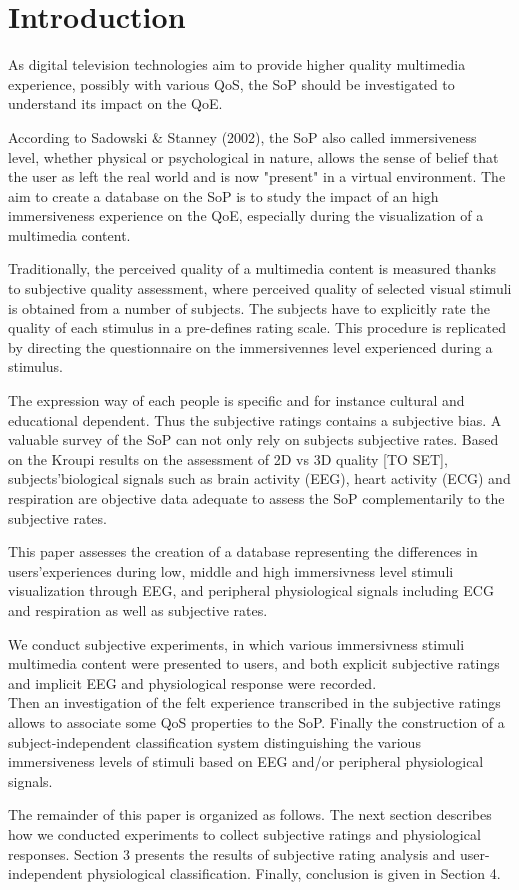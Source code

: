 \section{Introduction}
As digital television technologies aim to provide higher quality multimedia experience, possibly with various \ac{QoS}, the \ac{SoP} should be investigated to understand its impact on the \ac{QoE}.

According to Sadowski \& Stanney (2002), the \ac{SoP} also called immersiveness level, whether physical or psychological in nature, allows the sense of belief that the user as left the real world and is now "present" in a virtual environment. The aim to create a database on the \ac{SoP} is to study the impact of an high immersiveness experience on the \ac{QoE}, especially during the visualization of a multimedia content.

Traditionally, the perceived quality of a multimedia content is measured thanks to subjective quality assessment, where perceived quality of selected visual stimuli is obtained from a number of subjects. The subjects have to explicitly rate the quality of each stimulus in a pre-defines rating scale. This procedure is replicated by directing the questionnaire on the immersivennes level experienced during a stimulus.

The expression way of each people is specific and for instance cultural and educational dependent. Thus the subjective ratings contains a subjective bias. A valuable survey of the \ac{SoP} can not only rely on subjects subjective rates. Based on the Kroupi results on the assessment of 2D vs 3D quality [TO SET], subjects'biological signals such as brain activity (\ac{EEG}), heart activity (\ac{ECG}) and respiration are objective data adequate to assess the \ac{SoP} complementarily to the subjective rates.

This paper assesses the creation of a database representing the differences in users'experiences during low, middle and high immersivness level stimuli visualization through \ac{EEG}, and peripheral physiological signals including \ac{ECG} and respiration as well as subjective rates.

We conduct subjective experiments, in which various immersivness stimuli multimedia content were presented to users, and both explicit subjective ratings and implicit \ac{EEG} and physiological response were recorded.
\\Then an investigation of the felt experience transcribed in the subjective ratings allows to associate some \ac{QoS} properties to the \ac{SoP}. Finally the construction of a subject-independent classification system distinguishing the various immersiveness levels of stimuli based on \ac{EEG} and/or peripheral physiological signals.

The remainder of this paper is organized as follows.
The next section describes how we conducted experiments to collect subjective ratings and physiological responses. Section 3 presents the results of subjective rating analysis and user-independent physiological classification. Finally, conclusion is given in Section 4.